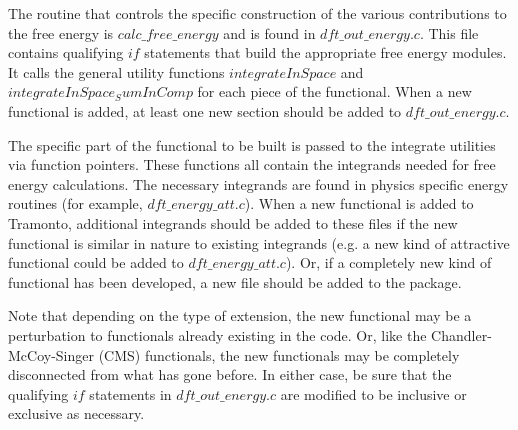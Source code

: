 \documentclass[10pt,onecolumn]{article}
\begin{document}
The routine that controls the specific construction of the various contributions to the free energy is $calc\_free\_energy$ and is found in $dft\_out\_energy.c$.  This file contains qualifying $if$ statements that build the appropriate free energy modules.  It calls the general utility functions $integrateInSpace$ and $integrateInSpace_SumInComp$ for each piece of the functional.  When a new functional is added, at least one new section should be added to $dft\_out\_energy.c$.

The specific part of the functional to be built is passed to the integrate utilities via function pointers.  These functions all contain the integrands needed for free energy calculations.  The necessary integrands are found in physics specific energy routines (for example, $dft\_energy\_att.c$).  When a new functional is added to Tramonto, additional integrands should be added to these files if the new functional is similar in nature to existing integrands (e.g. a new kind of attractive functional could be added to $dft\_energy\_att.c$).  Or, if a completely new kind of functional has been developed, a new file should be added to the package.

Note that depending on the type of extension, the new functional may be a perturbation to functionals already existing in the code.  Or, like the Chandler-McCoy-Singer (CMS) functionals, the new functionals may be completely disconnected from what has gone before.  In either case, be sure that the qualifying $if$ statements in $dft\_out\_energy.c$ are modified to be inclusive or exclusive as necessary.
\end{document}
